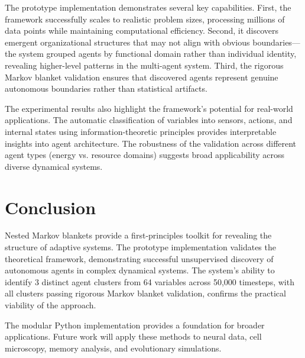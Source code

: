 \documentclass[10pt,conference]{IEEEtran}
\begin{document}
The prototype implementation demonstrates several key capabilities. First, the framework successfully scales to realistic problem sizes, processing millions of data points while maintaining computational efficiency. Second, it discovers emergent organizational structures that may not align with obvious boundaries—the system grouped agents by functional domain rather than individual identity, revealing higher-level patterns in the multi-agent system. Third, the rigorous Markov blanket validation ensures that discovered agents represent genuine autonomous boundaries rather than statistical artifacts.

The experimental results also highlight the framework's potential for real-world applications. The automatic classification of variables into sensors, actions, and internal states using information-theoretic principles provides interpretable insights into agent architecture. The robustness of the validation across different agent types (energy vs. resource domains) suggests broad applicability across diverse dynamical systems.

\section{Conclusion}
Nested Markov blankets provide a first‐principles toolkit for revealing the structure of adaptive systems. The prototype implementation validates the theoretical framework, demonstrating successful unsupervised discovery of autonomous agents in complex dynamical systems. The system's ability to identify 3 distinct agent clusters from 64 variables across 50,000 timesteps, with all clusters passing rigorous Markov blanket validation, confirms the practical viability of the approach.

The modular Python implementation provides a foundation for broader applications. Future work will apply these methods to neural data, cell microscopy, memory analysis, and evolutionary simulations.



\end{document}
